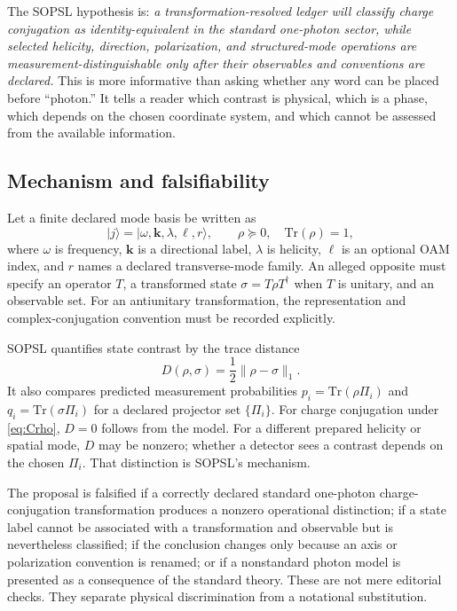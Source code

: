\documentclass[conference]{../../../../Conference-LaTeX-template_10-17-19/IEEEtran}
\begin{document}
The SOPSL hypothesis is: \emph{a transformation-resolved ledger will classify charge conjugation as identity-equivalent in the standard one-photon sector, while selected helicity, direction, polarization, and structured-mode operations are measurement-distinguishable only after their observables and conventions are declared.} This is more informative than asking whether any word can be placed before ``photon.'' It tells a reader which contrast is physical, which is a phase, which depends on the chosen coordinate system, and which cannot be assessed from the available information.

\subsection{Mechanism and falsifiability}
Let a finite declared mode basis be written as
\begin{equation}
\lvert j\rangle=\lvert\omega,\mathbf{k},\lambda,\ell,r\rangle,
\qquad
\rho\succeq0,\quad \mathrm{Tr}(\rho)=1,
\label{eq:basis}
\end{equation}
where $\omega$ is frequency, $\mathbf{k}$ is a directional label, $\lambda$ is helicity, $\ell$ is an optional OAM index, and $r$ names a declared transverse-mode family. An alleged opposite must specify an operator $T$, a transformed state $\sigma=T\rho T^\dagger$ when $T$ is unitary, and an observable set. For an antiunitary transformation, the representation and complex-conjugation convention must be recorded explicitly.

SOPSL quantifies state contrast by the trace distance
\begin{equation}
D(\rho,\sigma)=\frac{1}{2}\lVert\rho-\sigma\rVert_1.
\label{eq:trace-distance}
\end{equation}
It also compares predicted measurement probabilities $p_i=\mathrm{Tr}(\rho\Pi_i)$ and $q_i=\mathrm{Tr}(\sigma\Pi_i)$ for a declared projector set $\{\Pi_i\}$. For charge conjugation under \eqref{eq:Crho}, $D=0$ follows from the model. For a different prepared helicity or spatial mode, $D$ may be nonzero; whether a detector sees a contrast depends on the chosen $\Pi_i$. That distinction is SOPSL’s mechanism.

The proposal is falsified if a correctly declared standard one-photon charge-conjugation transformation produces a nonzero operational distinction; if a state label cannot be associated with a transformation and observable but is nevertheless classified; if the conclusion changes only because an axis or polarization convention is renamed; or if a nonstandard photon model is presented as a consequence of the standard theory. These are not mere editorial checks. They separate physical discrimination from a notational substitution.
\end{document}
